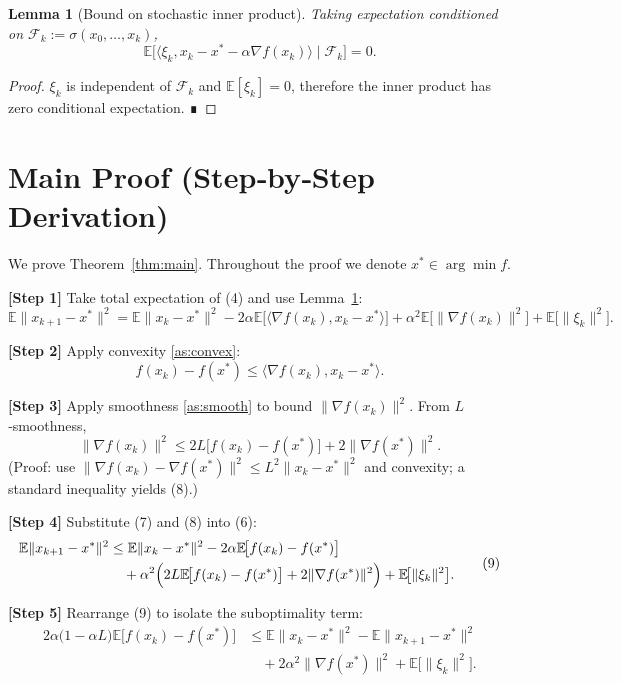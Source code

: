 \documentclass{article}
\newtheorem{lemma}{Lemma}
\newcommand{\E}{\mathbb{E}}
\begin{document}
\begin{lemma}[Bound on stochastic inner product]\label{lem:inner}
Taking expectation conditioned on $\mathcal{F}_{k}:=\sigma(x_{0},\dots,x_{k})$,
\[
\E\!\bigl[\langle \xi_{k},x_{k}-x^{*}-\alpha\nabla f(x_{k})\rangle\mid\mathcal{F}_{k}\bigr]=0 .
\tag{5}
\]
\end{lemma}
\begin{proof}
$\xi_{k}$ is independent of $\mathcal{F}_{k}$ and $\E[\xi_{k}]=0$, therefore the inner product has zero conditional expectation. ∎
\end{proof}

\section*{Main Proof (Step‑by‑Step Derivation)}
We prove Theorem~\ref{thm:main}. Throughout the proof we denote $x^{*}\in\arg\min f$.

\noindent\textbf{[Step 1]} Take total expectation of (4) and use Lemma~\ref{lem:inner}:
\[
\E\|x_{k+1}-x^{*}\|^{2}
= \E\|x_{k}-x^{*}\|^{2}
-2\alpha\E\!\bigl[\langle \nabla f(x_{k}),x_{k}-x^{*}\rangle\bigr]
+\alpha^{2}\E\!\bigl[\|\nabla f(x_{k})\|^{2}\bigr]
+\E\!\bigl[\|\xi_{k}\|^{2}\bigr].
\tag{6}
\]

\noindent\textbf{[Step 2]} Apply convexity \ref{as:convex}:
\[
f(x_{k})-f(x^{*})\le \langle \nabla f(x_{k}),x_{k}-x^{*}\rangle .
\tag{7}
\]

\noindent\textbf{[Step 3]} Apply smoothness \ref{as:smooth} to bound $\|\nabla f(x_{k})\|^{2}$.
From $L$‑smoothness,
\[
\|\nabla f(x_{k})\|^{2}
\le 2L\bigl[f(x_{k})-f(x^{*})\bigr] + 2\|\nabla f(x^{*})\|^{2}.
\tag{8}
\]
(Proof: use $\|\nabla f(x_{k})-\nabla f(x^{*})\|^{2}\le L^{2}\|x_{k}-x^{*}\|^{2}$ and convexity; a standard inequality yields (8).)

\noindent\textbf{[Step 4]} Substitute (7) and (8) into (6):
\[
\begin{aligned}
\E\|x_{k+1}-x^{*}\|^{2}
&\le \E\|x_{k}-x^{*}\|^{2}
-2\alpha\E\!\bigl[f(x_{k})-f(x^{*})\bigr] \\
&\quad +\alpha^{2}\Bigl(2L\E\!\bigl[f(x_{k})-f(x^{*})\bigr]
+2\|\nabla f(x^{*})\|^{2}\Bigr)
+\E\!\bigl[\|\xi_{k}\|^{2}\bigr].
\end{aligned}
\tag{9}
\]

\noindent\textbf{[Step 5]} Rearrange (9) to isolate the suboptimality term:
\[
\begin{aligned}
2\alpha\bigl(1-\alpha L\bigr)\E\!\bigl[f(x_{k})-f(x^{*})\bigr]
&\le \E\|x_{k}-x^{*}\|^{2}
-\E\|x_{k+1}-x^{*}\|^{2}\\
&\quad +2\alpha^{2}\|\nabla f(x^{*})\|^{2}
+\E\!\bigl[\|\xi_{k}\|^{2}\bigr].
\end{aligned}
\tag{10}
\]
\end{document}
